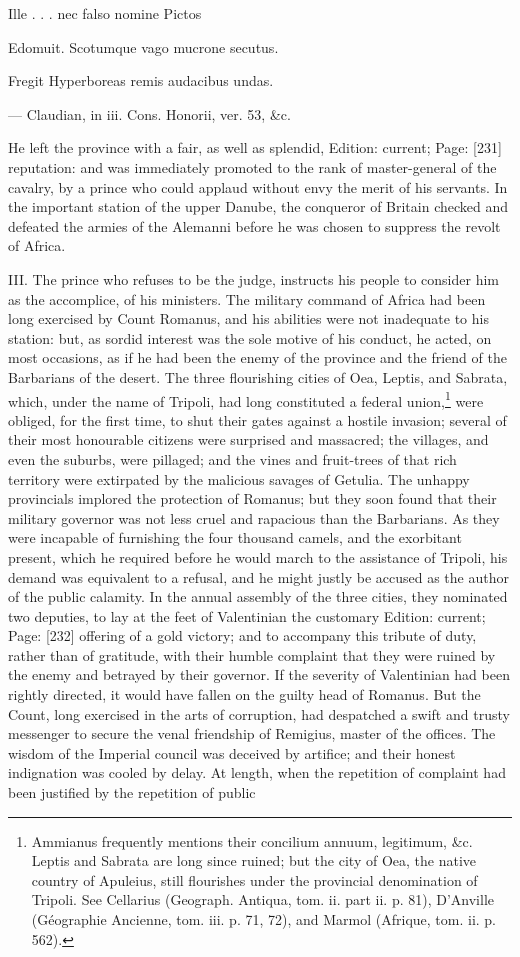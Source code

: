 {Ille . . . nec falso nomine Pictos

Edomuit. Scotumque vago mucrone secutus.

Fregit Hyperboreas remis audacibus undas.

\texthebrew{—} Claudian, in iii. Cons. Honorii, ver. 53, \&c.} He left the province with a fair, as well as splendid, Edition: current; Page: [231] reputation: and was immediately promoted to the rank of master-general of the cavalry, by a prince who could applaud without envy the merit of his servants. In the important station of the upper Danube, the conqueror of Britain checked and defeated the armies of the Alemanni before he was chosen to suppress the revolt of Africa.

III. The prince who refuses to be the judge, instructs his people to consider him as the accomplice, of his ministers. The military command of Africa had been long exercised by Count Romanus, and his abilities were not inadequate to his station: but, as sordid interest was the sole motive of his conduct, he acted, on most occasions, as if he had been the enemy of the province and the friend of the Barbarians of the desert. The three flourishing cities of Oea, Leptis, and Sabrata, which, under the name of Tripoli, had long constituted a federal union,\footnote{Ammianus frequently mentions their concilium annuum, legitimum, \&c. Leptis and Sabrata are long since ruined; but the city of Oea, the native country of Apuleius, still flourishes under the provincial denomination of Tripoli. See Cellarius (Geograph. Antiqua, tom. ii. part ii. p. 81), D\texthebrew{}’Anville (Géographie Ancienne, tom. iii. p. 71, 72), and Marmol (Afrique, tom. ii. p. 562).} were obliged, for the first time, to shut their gates against a hostile invasion; several of their most honourable citizens were surprised and massacred; the villages, and even the suburbs, were pillaged; and the vines and fruit-trees of that rich territory were extirpated by the malicious savages of Getulia. The unhappy provincials implored the protection of Romanus; but they soon found that their military governor was not less cruel and rapacious than the Barbarians. As they were incapable of furnishing the four thousand camels, and the exorbitant present, which he required before he would march to the assistance of Tripoli, his demand was equivalent to a refusal, and he might justly be accused as the author of the public calamity. In the annual assembly of the three cities, they nominated two deputies, to lay at the feet of Valentinian the customary Edition: current; Page: [232] offering of a gold victory; and to accompany this tribute of duty, rather than of gratitude, with their humble complaint that they were ruined by the enemy and betrayed by their governor. If the severity of Valentinian had been rightly directed, it would have fallen on the guilty head of Romanus. But the Count, long exercised in the arts of corruption, had despatched a swift and trusty messenger to secure the venal friendship of Remigius, master of the offices. The wisdom of the Imperial council was deceived by artifice; and their honest indignation was cooled by delay. At length, when the repetition of complaint had been justified by the repetition of public 